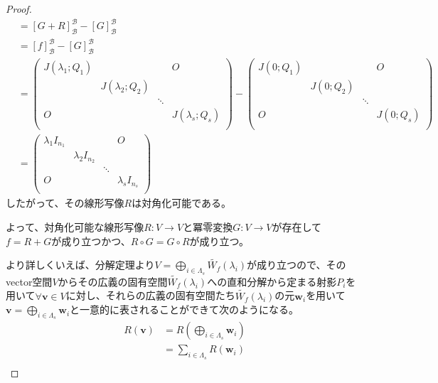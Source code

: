 \documentclass[dvipdfmx]{jsarticle}
\begin{document}
\begin{proof}
\begin{align*}
&= [G + R]_{\mathcal{B}}^{\mathcal{B}} - [G]_{\mathcal{B}}^{\mathcal{B}} \\
&= [f]_{\mathcal{B}}^{\mathcal{B}} - [G]_{\mathcal{B}}^{\mathcal{B}} \\
&= \begin{pmatrix}
J\left( \lambda_{1};Q_{1} \right) & \  & \  & O \\
\  & J\left( \lambda_{2};Q_{2} \right) & \  & \  \\
\  & \  & \ddots & \  \\
O & \  & \  & J\left( \lambda_{s};Q_{s} \right) \\
\end{pmatrix} - \begin{pmatrix}
J\left( 0;Q_{1} \right) & \  & \  & O \\
\  & J\left( 0;Q_{2} \right) & \  & \  \\
\  & \  & \ddots & \  \\
O & \  & \  & J\left( 0;Q_{s} \right) \\
\end{pmatrix} \\
&= \begin{pmatrix}
\lambda_{1}I_{n_{1}} & \  & \  & O \\
\  & \lambda_{2}I_{n_{2}} & \  & \  \\
\  & \  & \ddots & \  \\
O & \  & \  & \lambda_{s}I_{n_{s}} \\
\end{pmatrix}
\end{align*}
したがって、その線形写像$R$は対角化可能である。\par
よって、対角化可能な線形写像$R:V \rightarrow V$と冪零変換$G:V \rightarrow V$が存在して$f = R + G$が成り立つかつ、$R \circ G = G \circ R$が成り立つ。\par
より詳しくいえば、分解定理より$V = \bigoplus_{i \in \varLambda_{s}} {\widetilde{W_{f}}\left( \lambda_{i} \right)}$が成り立つので、そのvector空間$V$からその広義の固有空間$\widetilde{W_{f}}\left( \lambda_{i} \right)$への直和分解から定まる射影$P_{i}$を用いて$\forall\mathbf{v} \in V$に対し、それらの広義の固有空間たち$\widetilde{W_{f}}\left( \lambda_{i} \right)$の元$\mathbf{w}_{i}$を用いて$\mathbf{v} = \bigoplus_{i \in \varLambda_{s}} \mathbf{w}_{i}$と一意的に表されることができて次のようになる。
\begin{align*}
R\left( \mathbf{v} \right) &= R\left( \bigoplus_{i \in \varLambda_{s}} \mathbf{w}_{i} \right) \\
&= \sum_{i \in \varLambda_{s}} {R\left( \mathbf{w}_{i} \right)} \\

\end{align*}
\end{proof}
\end{document}
